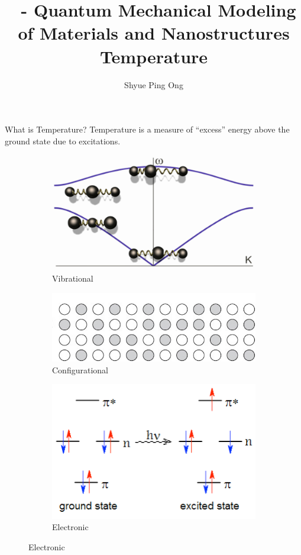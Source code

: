 \documentclass[aspectratio=169]{beamer}
\title[\classname Temperature]{\classname~- Quantum Mechanical Modeling of Materials and Nanostructures\\Temperature}
\author{Shyue Ping Ong}
\institute[UCSD]{University of California, San Diego\\
\medskip
}
\date{\classyear} %
\begin{document}
    \begin{frame}
        \titlepage %
    \end{frame}

    \begin{frame}{What is Temperature?}
        Temperature is a measure of ``excess'' energy above the ground state due to excitations.

        \begin{figure}
            \centering
            \begin{subfigure}{0.45\textwidth}
                \centering
                \includegraphics[width=0.5\linewidth]{figures/10_vibrational.png}
                \caption{Vibrational}
            \end{subfigure}
            \begin{subfigure}{0.45\textwidth}
                \centering
                \includegraphics[width=0.7\linewidth]{figures/10_configurational.png}
                \caption{Configurational}
            \end{subfigure}
            \begin{subfigure}{0.45\textwidth}
                \centering
                \includegraphics[width=0.5\linewidth]{figures/10_electronic.png}
                \caption{Electronic}
            \end{subfigure}

\end{figure}
\end{frame}
\end{document}
